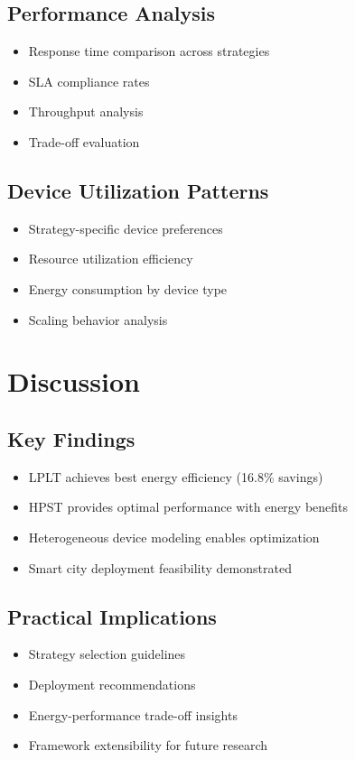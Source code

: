 \documentclass[12pt,a4paper]{report}
\begin{document}
\subsection{Performance Analysis}
\begin{itemize}[leftmargin=1cm]
    \item Response time comparison across strategies
    \item SLA compliance rates
    \item Throughput analysis
    \item Trade-off evaluation
\end{itemize}

\subsection{Device Utilization Patterns}
\begin{itemize}[leftmargin=1cm]
    \item Strategy-specific device preferences
    \item Resource utilization efficiency
    \item Energy consumption by device type
    \item Scaling behavior analysis
\end{itemize}

\section{Discussion}

\subsection{Key Findings}
\begin{itemize}[leftmargin=1cm]
    \item LPLT achieves best energy efficiency (16.8\% savings)
    \item HPST provides optimal performance with energy benefits
    \item Heterogeneous device modeling enables optimization
    \item Smart city deployment feasibility demonstrated
\end{itemize}

\subsection{Practical Implications}
\begin{itemize}[leftmargin=1cm]
    \item Strategy selection guidelines
    \item Deployment recommendations
    \item Energy-performance trade-off insights
    \item Framework extensibility for future research
\end{itemize}
\end{document}
